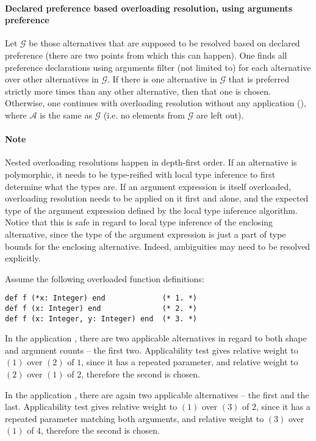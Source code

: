 \paragraph{Declared preference based overloading resolution, using arguments preference}
Let $\mathcal{G}$ be those alternatives that are supposed to be resolved based on declared preference (there are two points from which this can happen). One finds all preference declarations using arguments filter (not limited to) for each alternative over other alternatives in $\mathcal{G}$. If there is one alternative in $\mathcal{G}$ that is preferred strictly more times than any other alternative, then that one is chosen. Otherwise, one continues with overloading resolution without any application (), where $\mathcal{A}$ is the same as $\mathcal{G}$ (i.e. no elements from $\mathcal{G}$ are left out). 

\paragraph{Note}
Nested overloading resolutions happen in depth-first order. If an alternative is polymorphic, it needs to be type-reified with local type inference to first determine what the types are. If an argument expression is itself overloaded, overloading resolution needs to be applied on it first and alone, and the expected type of the argument expression defined by the local type inference algorithm. Notice that this is safe in regard to local type inference of the enclosing alternative, since the type of the argument expression is just a part of type bounds for the enclosing alternative. Indeed, ambiguities may need to be resolved explicitly. 

\example Assume the following overloaded function definitions:
\begin{lstlisting}
def f (*x: Integer) end             (* 1. *)
def f (x: Integer) end              (* 2. *)
def f (x: Integer, y: Integer) end  (* 3. *)
\end{lstlisting}

In the application , there are two applicable alternatives in regard to both shape and argument counts -- the first two. Applicability test gives relative weight to $(1)$ over $(2)$ of $1$, since it has a repeated parameter, and relative weight to $(2)$ over $(1)$ of 2, therefore the second is chosen. 

In the application , there are again two applicable alternatives -- the first and the last. Applicability test gives relative weight to $(1)$ over $(3)$ of $2$, since it has a repeated parameter matching both arguments, and relative weight to $(3)$ over $(1)$ of $4$, therefore the second is chosen. 

